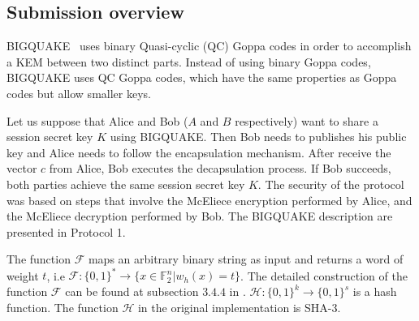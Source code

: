 \label{sec:attack}
\subsection{Submission overview}
BIGQUAKE~\cite{bardet2017big} uses binary Quasi-cyclic (QC) Goppa codes in order to accomplish a KEM between two distinct parts. Instead of using binary Goppa codes, BIGQUAKE uses QC Goppa codes, which have the same properties as Goppa codes but allow smaller keys.

Let us suppose that Alice and Bob ($A$ and $B$ respectively) want to share a session secret key $K$ using BIGQUAKE. Then Bob needs to publishes his public key and Alice needs to follow the encapsulation mechanism. After receive the vector $c$ from Alice, Bob executes the decapsulation process. If Bob succeeds, both parties achieve the same session secret key $K$. The security of the protocol was based on steps that involve the McEliece encryption performed by Alice, and the McEliece decryption performed by Bob. The BIGQUAKE description are presented in Protocol 1.

The function $\mathcal{F}$ maps an arbitrary binary string as input and returns a word of weight $t$, i.e $\mathcal{F}: \{0,1\}^* \to \{x \in \mathbb{F}^n_2 | w_h(x) = t\}$. The detailed construction of the function $\mathcal{F}$ can be found at subsection $3.4.4$ in \cite{bardet2017big}. $\mathcal{H} : \{0,1\}^k \to \{0,1\}^s$ is a hash function. The function $\mathcal{H}$ in the original implementation is SHA-3. 


